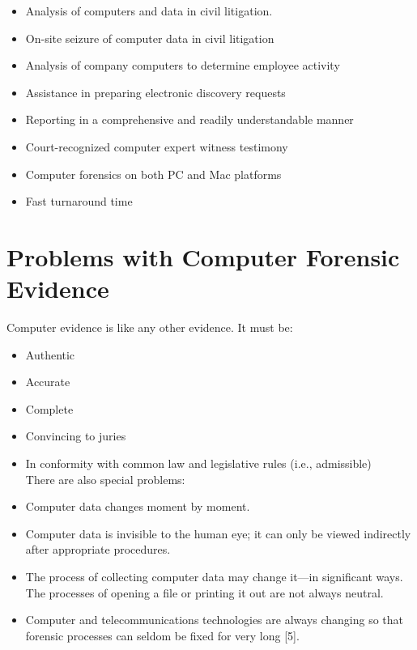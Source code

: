 \documentclass{scrreprt}
\begin{document}
\begin{itemize}
\begin{itemize}
\item Analysis of computers and data in civil litigation.
\item On-site seizure of computer data in civil litigation
\item Analysis of company computers to determine employee activity
\item Assistance in preparing electronic discovery requests
\item Reporting in a comprehensive and readily understandable manner
\item Court-recognized computer expert witness testimony
\item Computer forensics on both PC and Mac platforms
\item Fast turnaround time
\end{itemize}
\end{itemize}
\section{Problems with Computer Forensic Evidence}
Computer evidence is like any other evidence. It must be:
\begin{itemize}
\item Authentic
\item Accurate
\item Complete
\item Convincing to juries
\item In conformity with common law and legislative rules (i.e., admissible)
\\\linebreak There are also special problems:
\item Computer data changes moment by moment.
\item Computer data is invisible to the human eye; it can only be viewed indirectly
after appropriate procedures.
\item The process of collecting computer data may change it—in significant ways.
The processes of opening a file or printing it out are not always neutral.
\item Computer and telecommunications technologies are always changing so that
forensic processes can seldom be fixed for very long [5].
\end{itemize}
\end{document}
